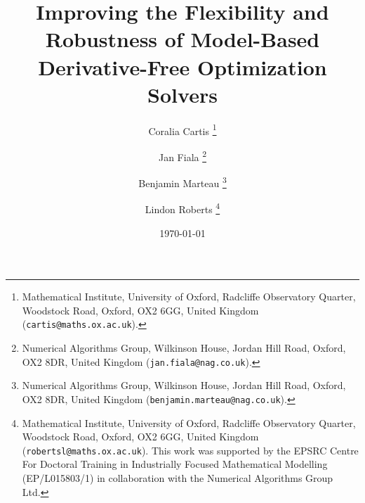 \documentclass[a4paper]{article}
\numberwithin{equation}{section} %
\theoremstyle{plain}
\theoremstyle{definition}
\theoremstyle{remark}
\begin{document}
\title{Improving the Flexibility and Robustness of Model-Based Derivative-Free Optimization Solvers}
\author{
	Coralia Cartis \thanks{Mathematical Institute, University of Oxford, Radcliffe Observatory Quarter, Woodstock Road, Oxford, OX2 6GG, United Kingdom (\texttt{cartis@maths.ox.ac.uk}).}
	\and
	Jan Fiala \thanks{Numerical Algorithms Group, Wilkinson House, Jordan Hill Road, Oxford, OX2 8DR, United Kingdom (\texttt{jan.fiala@nag.co.uk}).}
	\and
	Benjamin Marteau \thanks{Numerical Algorithms Group, Wilkinson House, Jordan Hill Road, Oxford, OX2 8DR, United Kingdom (\texttt{benjamin.marteau@nag.co.uk}).}
	\and
	Lindon Roberts \thanks{Mathematical Institute, University of Oxford, Radcliffe Observatory Quarter, Woodstock Road, Oxford, OX2 6GG, United Kingdom (\texttt{robertsl@maths.ox.ac.uk}). This work was supported by the EPSRC Centre For Doctoral Training in Industrially Focused Mathematical Modelling (EP/L015803/1) in collaboration with the Numerical Algorithms Group Ltd.}
}
\date{\today}
\maketitle
\end{document}
